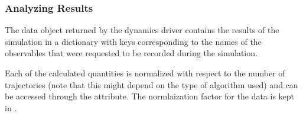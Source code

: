 \documentclass[letterpaper,10pt,english]{sphinxmanual}
\begin{document}
\begin{sphinxVerbatim}[commandchars=\\\{\}]
  
\end{sphinxVerbatim}


\subsubsection{Analyzing Results}
\label{\detokenize{user_guide/quickstart/quickstart:analyzing-results}}
\sphinxAtStartPar
The data object returned by the dynamics driver contains the results of the simulation in a dictionary with keys corresponding
to the names of the observables that were requested to be recorded during the simulation.

\begin{sphinxVerbatim}[commandchars=\\\{\}]
 
\end{sphinxVerbatim}

\sphinxAtStartPar
Each of the calculated quantities is normalized with respect to the number of trajectories (note that this might depend on the type of algorithm used) and can be accessed through the  attribute.
The normlaization factor for the data is kept in .

\begin{sphinxVerbatim}[commandchars=\\\{\}]
  \PYG{p}{[}\PYG{p}{]}
  \PYG{p}{[}\PYG{p}{]}
  \PYG{p}{[}\PYG{p}{]}
   \PYG{p}{[}\PYG{p}{]}
\end{sphinxVerbatim}
\end{document}
